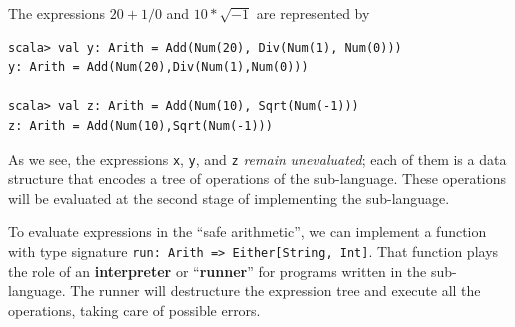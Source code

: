The expressions $20+1/0$ and $10*\sqrt{-1}$ are represented by
\begin{lstlisting}
scala> val y: Arith = Add(Num(20), Div(Num(1), Num(0)))
y: Arith = Add(Num(20),Div(Num(1),Num(0)))

scala> val z: Arith = Add(Num(10), Sqrt(Num(-1)))
z: Arith = Add(Num(10),Sqrt(Num(-1)))
\end{lstlisting}
As we see, the expressions \lstinline!x!, \lstinline!y!, and \lstinline!z!
\emph{remain} \emph{unevaluated}; each of them is a data structure
that encodes a tree of operations of the sub-language. These operations
will be evaluated at the second stage of implementing the sub-language.

To evaluate expressions in the \textsf{``}safe arithmetic\textsf{''}, we can implement
a function with type signature \lstinline!run: Arith => Either[String, Int]!.
That function plays the role of an \textbf{interpreter}
or \textsf{``}\textbf{runner}\textsf{''} for programs written in the
sub-language. The runner will destructure the expression tree and
execute all the operations, taking care of possible errors. 

